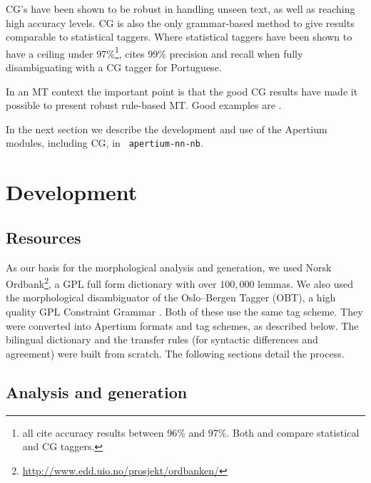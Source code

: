 \documentclass[11pt]{article}
\newcommand{\comment}[1]{\textbf{SKRIV} {\it #1}}
\renewcommand{\comment}[1]{}
\begin{document}
\comment{changed ``parse'' to ``tag'', although most CG's use some
  ``parsing'' to improve ``tagging''...}

CG's have been shown to be robust in handling unseen text, as well as
reaching high accuracy levels. CG is also the only grammar-based
method to give results comparable to statistical taggers. Where
statistical taggers have been shown to have a ceiling under
97\%\footnote{\citet{leech1994claws, brants2000tnt, brill1997uld} all
  cite accuracy results between 96\% and 97\%. Both
  \citet{chanod1995tfc} and \citet{samuelsson1997cls} compare
  statistical and CG taggers.},
\citet[p.~187--188]{bick2000palavras} cites 99\% precision and recall
when fully disambiguating with a CG tagger for Portuguese.

In an MT context the important point is that the good CG results have 
made it possible to present robust rule-based MT. Good examples are
\citet{bick2007fmw}. %

In the next section we describe the development and use of the
Apertium modules, including CG, in {\tt \small 
  apertium-nn-nb}.

\section{Development}

  \label{sec:development}
\subsection{Resources}

As our basis for the morphological analysis and generation, we used
Norsk
Ordbank\footnote{\href{http://www.edd.uio.no/prosjekt/ordbanken/}{http://www.edd.uio.no/prosjekt/ordbanken/}
}, a GPL full form dictionary with over $100,000$ lemmas. We also used
the morphological disambiguator of the Oslo–Bergen Tagger (OBT), a
high quality GPL Constraint Grammar \citep{hagen2000cbt}. Both of
these use the same tag scheme. They were converted into Apertium
formats and tag schemes, as described below. The bilingual dictionary and
the transfer rules (for syntactic differences and agreement) were built from 
scratch. The following sections detail the process.

\subsection{Analysis and generation}
\end{document}
